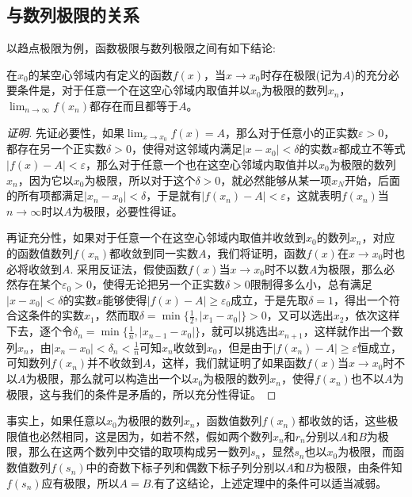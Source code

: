 \subsection{与数列极限的关系}
\label{sec:relation-between-limit-of-function-and-number-sequence}

以趋点极限为例，函数极限与数列极限之间有如下结论:
\begin{theorem}[函数极限与数列极限的关系]
  在$x_0$的某空心邻域内有定义的函数$f(x)$，当$x \to x_0$时存在极限(记为$A$)的充分必要条件是，对于任意一个在这空心邻域内取值并以$x_0$为极限的数列$x_n$，$\lim_{n \to \infty}f(x_n)$都存在而且都等于$A$。
\end{theorem}

\begin{proof}[证明]
  先证必要性，如果$\lim_{x \to x_0} f(x) = A$，那么对于任意小的正实数$\varepsilon > 0$，都存在另一个正实数$\delta > 0$，使得对这邻域内满足$|x-x_0|<\delta$的实数$x$都成立不等式$|f(x)-A|<\varepsilon$，那么对于任意一个也在这空心邻域内取值并以$x_0$为极限的数列$x_n$，因为它以$x_0$为极限，所以对于这个$\delta>0$，就必然能够从某一项$x_N$开始，后面的所有项都满足$|x_n-x_0|<\delta$，于是就有$|f(x_n)-A|<\varepsilon$，这就表明$f(x_n)$当$n \to \infty$时以$A$为极限，必要性得证。

  再证充分性，如果对于任意一个在这空心邻域内取值并收敛到$x_0$的数列$x_n$，对应的函数值数列$f(x_n)$都收敛到同一实数$A$，我们将证明，函数$f(x)$在$x \to x_0$时也必将收敛到$A$. 采用反证法，假使函数$f(x)$当$x \to x_0$时不以数$A$为极限，那么必然存在某个$\varepsilon_0>0$，使得无论把另一个正实数$\delta>0$限制得多么小，总有满足$|x-x_0|<\delta$的实数$x$能够使得$|f(x)-A| \geqslant \varepsilon_0$成立，于是先取$\delta=1$，得出一个符合这条件的实数$x_1$，然而取$\delta=\min\{\frac{1}{2}, |x_1-x_0|\}>0$，又可以选出$x_2$，依次这样下去，逐个令$\delta_n=\min\{\frac{1}{n}, |x_{n-1}-x_0|\}$，就可以挑选出$x_{n+1}$，这样就作出一个数列$x_n$，由$|x_n-x_0|<\delta_n<\frac{1}{n}$可知$x_n$收敛到$x_0$，但是由于$|f(x_n)-A| \geqslant \varepsilon$恒成立，可知数列$f(x_n)$并不收敛到$A$，这样，我们就证明了如果函数$f(x)$当$x \to x_0$时不以$A$为极限，那么就可以构造出一个以$x_0$为极限的数列$x_n$，使得$f(x_n)$也不以$A$为极限，这与我们的条件是矛盾的，所以充分性得证。
\end{proof}

事实上，如果任意以$x_0$为极限的数列$x_n$，函数值数列$f(x_n)$都收敛的话，这些极限值也必然相同，这是因为，如若不然，假如两个数列$x_n$和$r_n$分别以$A$和$B$为极限，那么在这两个数列中交错的取项构成另一数列$s_n$，显然$s_n$也以$x_0$为极限，而函数值数列$f(s_n)$中的奇数下标子列和偶数下标子列分别以$A$和$B$为极限，由条件知$f(s_n)$应有极限，所以$A=B$.有了这结论，上述定理中的条件可以适当减弱。


